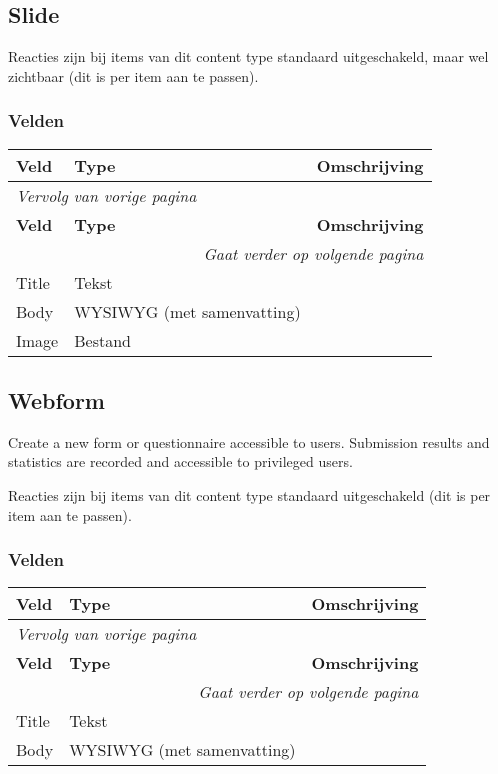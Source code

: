 \subsection{Slide}
\label{sec:content-slide}
Reacties zijn bij items van dit content type standaard uitgeschakeld, maar wel zichtbaar (dit is per item aan te passen).

\subsubsection{Velden}
  \begin{longtable}{| p{3.75cm}|p{3.75cm}|p{7.50cm}|}
  \hline
  \rowcolor{tableheader}
  \textbf{Veld} & \textbf{Type} & \textbf{Omschrijving}  \tabularnewline
  \hline
\endfirsthead
\multicolumn{3}{l}{\textit{Vervolg van vorige pagina}} \\
\hline
\rowcolor{tableheader}
  \textbf{Veld} & \textbf{Type} & \textbf{Omschrijving}  \tabularnewline
  \hline
\hline
\endhead
\multicolumn{3}{r}{\textit{Gaat verder op volgende pagina}} \\
\endfoot
\hline
\endlastfoot
  \raggedright{Title} & \raggedright{Tekst} & \raggedright{}  \tabularnewline
  \hline
  \raggedright{Body} & \raggedright{WYSIWYG (met samenvatting)} & \raggedright{}  \tabularnewline
  \hline
  \raggedright{Image} & \raggedright{Bestand} & \raggedright{}  \tabularnewline
  \hline
  \end{longtable}

\subsection{Webform}
\label{sec:content-webform}
Create a new form or questionnaire accessible to users. Submission results and statistics are recorded and accessible to privileged users.

Reacties zijn bij items van dit content type standaard uitgeschakeld (dit is per item aan te passen).

\subsubsection{Velden}
  \begin{longtable}{| p{3.75cm}|p{3.75cm}|p{7.50cm}|}
  \hline
  \rowcolor{tableheader}
  \textbf{Veld} & \textbf{Type} & \textbf{Omschrijving}  \tabularnewline
  \hline
\endfirsthead
\multicolumn{3}{l}{\textit{Vervolg van vorige pagina}} \\
\hline
\rowcolor{tableheader}
  \textbf{Veld} & \textbf{Type} & \textbf{Omschrijving}  \tabularnewline
  \hline
\hline
\endhead
\multicolumn{3}{r}{\textit{Gaat verder op volgende pagina}} \\
\endfoot
\hline
\endlastfoot
  \raggedright{Title} & \raggedright{Tekst} & \raggedright{}  \tabularnewline
  \hline
  \raggedright{Body} & \raggedright{WYSIWYG (met samenvatting)} & \raggedright{}  \tabularnewline
  \hline
  \end{longtable}


